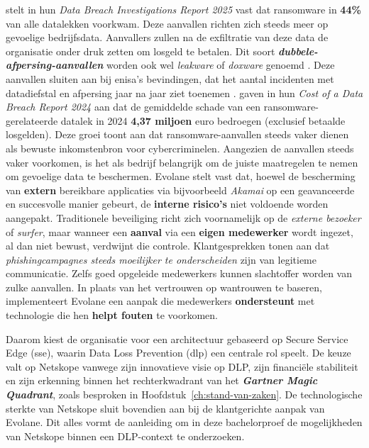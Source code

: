 \textcite{VerizonBusiness2025} stelt in hun \textit{Data Breach Investigations Report 2025} vast dat ransomware in \textbf{44\%} van alle datalekken voorkwam. 
Deze aanvallen richten zich steeds meer op gevoelige bedrijfsdata. 
Aanvallers zullen na de exfiltratie van deze data de organisatie onder druk zetten om losgeld te betalen.
Dit soort \textit\textbf{{dubbele-afpersing}-aanvallen} worden ook wel \textit{leakware} of \textit{doxware} genoemd \autocite{IBM2024}. 
Deze aanvallen sluiten aan bij \gls{enisa}'s bevindingen, dat het aantal incidenten met datadiefstal en afpersing jaar na jaar ziet toenemen \autocite{EUAC2022,EUAC2023}.
\textcite{IBMSecurity2024} gaven in hun \textit{Cost of a Data Breach Report 2024} aan dat de gemiddelde schade van een ransomware-gerelateerde datalek in 2024 \textbf{4,37 miljoen} euro bedroegen (exclusief betaalde losgelden).
Deze groei toont aan dat ransomware-aanvallen steeds vaker dienen als bewuste inkomstenbron voor cybercriminelen.
Aangezien de aanvallen steeds vaker voorkomen, is het als bedrijf belangrijk om de juiste maatregelen te nemen om gevoelige data te beschermen. 
Evolane stelt vast dat, hoewel de bescherming van \textbf{extern} bereikbare applicaties via bijvoorbeeld \textit{Akamai} op een geavanceerde en succesvolle manier gebeurt,
de \textbf{interne risico's} niet voldoende worden aangepakt.
Traditionele beveiliging richt zich voornamelijk op de \textit{externe bezoeker} of \textit{surfer}, maar wanneer een \textbf{aanval} via een \textbf{eigen medewerker} wordt ingezet, al dan niet bewust, verdwijnt die controle.
Klantgesprekken tonen aan dat \textit{phishingcampagnes steeds moeilijker te onderscheiden} zijn van legitieme communicatie. 
Zelfs goed opgeleide medewerkers kunnen slachtoffer worden van zulke aanvallen.
In plaats van het vertrouwen op wantrouwen te baseren,  implementeert Evolane een aanpak die medewerkers \textbf{ondersteunt} met technologie die hen \textbf{helpt fouten} te voorkomen. 

Daarom kiest de organisatie voor een architectuur gebaseerd op Secure Service Edge (\gls{sse}), waarin Data Loss Prevention (\gls{dlp}) een centrale rol speelt.
De keuze valt op Netskope vanwege zijn innovatieve visie op DLP, zijn financiële stabiliteit en zijn erkenning binnen het rechterkwadrant van het \textbf\textit{{Gartner Magic Quadrant}}, 
zoals besproken in Hoofdstuk~\ref{ch:stand-van-zaken}.
De technologische sterkte van Netskope sluit bovendien aan bij de klantgerichte aanpak van Evolane. 
Dit alles vormt de aanleiding om in deze bachelorproef de mogelijkheden van Netskope binnen een DLP-context te onderzoeken.

